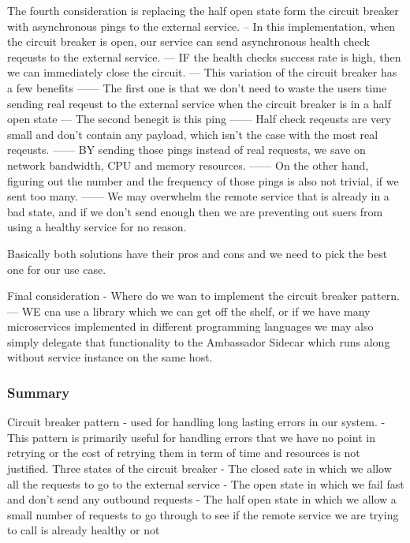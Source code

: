 \documentclass[a4paper, 11pt]{book}
\begin{document}
    The fourth consideration is replacing the half open state form the circuit breaker with asynchronous pings to the external service.
    -- In this implementation, when the circuit breaker is open, our service can send asynchronous health check reqeusts to the external service.
    --- IF the health checks success rate is high, then we can immediately close the circuit.
    --- This variation of the circuit breaker has a few benefits
    ------ The first one is that we don't need to waste the users time sending real reqeust to the external service when the circuit breaker is in a half open state
    --- The second benegit is this ping
    ------ Half check reqeusts are very small and don't contain any payload, which isn't the case with the most real reqeusts.
    ------ BY sending those pings instead of real requests, we save on network bandwidth, CPU and memory resources.
    ------ On the other hand, figuring out the number and the frequency of those pings is also not trivial, if we sent too many.
    ------ We may overwhelm the remote service that is already in a bad state, and if we don't send enough then we are preventing out suers from using a healthy service for no reason.

    Basically both solutions have their pros and cons and we need to pick the best one for our use case.

    Final consideration - Where do we wan to implement the circuit breaker pattern.
    --- WE cna use a library which we can get off the shelf, or if we have many microservices implemented in different programming languages we may also simply delegate that functionality to the Ambassador Sidecar which runs along without service instance on the same host.

    \subsubsection{Summary}
    Circuit breaker pattern - used for handling long lasting errors in our system.
    - This pattern is primarily useful for handling errors that we have no point in retrying or the cost of retrying them in term of time and resources is not justified.
    Three states of the circuit breaker
    - The closed sate in which we allow all the requests to go to the external service
    - The open state in which we fail fast and don't send any outbound requests
    - The half open state in which we allow a small number of requests to go through to see if the remote service we are trying to call is already healthy or not
\end{document}
